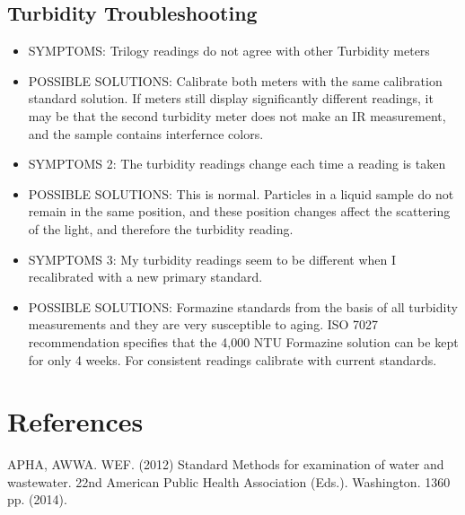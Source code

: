 \documentclass[12pt]{../SOP3_beta}
\begin{document}
\subsection{Turbidity Troubleshooting}
\begin{itemize}
  \item SYMPTOMS: Trilogy readings do not agree with other Turbidity meters
  \item POSSIBLE SOLUTIONS: Calibrate both meters with the same calibration standard solution. If meters still display significantly different readings, it may be that the second turbidity meter does not make an IR measurement, and the sample contains interfernce colors. 
  \item SYMPTOMS 2: The turbidity readings change each time a reading is taken
  \item POSSIBLE SOLUTIONS: This is normal. Particles in a liquid sample do not remain in the same position, and these position changes affect the scattering of the light, and therefore the turbidity reading. 
  \item SYMPTOMS 3: My turbidity readings seem to be different when I recalibrated with a new primary standard.
  \item POSSIBLE SOLUTIONS: Formazine standards from the basis of all turbidity measurements and they are very susceptible to aging. ISO 7027 recommendation specifies that the 4,000 NTU Formazine solution can be kept for only 4 weeks. For consistent readings calibrate with current standards. 
\end{itemize}

\section{References}

\NP APHA, AWWA. WEF. (2012) Standard Methods for examination of water and wastewater. 22nd American Public Health Association (Eds.). Washington. 1360 pp. (2014).
\end{document}
